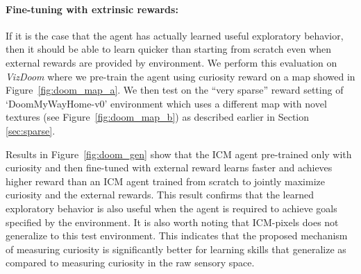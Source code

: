 \documentclass{article}
\begin{document}
\paragraph{Fine-tuning with extrinsic rewards:}
If it is the case that the agent has actually learned useful exploratory behavior, then it should be able to learn quicker than starting from scratch even when external rewards are provided by environment. We perform this evaluation on {\em VizDoom} where we pre-train the agent using curiosity reward on a map showed in Figure~\ref{fig:doom_map_a}. We then test on the ``very sparse'' reward setting of `DoomMyWayHome-v0' environment which uses a different map with novel textures (see Figure~\ref{fig:doom_map_b}) as described earlier in Section \ref{sec:sparse}.

Results in Figure~\ref{fig:doom_gen} show that the ICM agent pre-trained only with curiosity and then fine-tuned with external reward learns faster and achieves higher reward than an ICM agent trained from scratch to jointly maximize curiosity and the external rewards. This result confirms that the learned exploratory behavior is also useful when the agent is required to achieve goals specified by the environment. It is also worth noting that ICM-pixels does not generalize to this test environment. This indicates that the proposed mechanism of measuring curiosity is significantly better for learning skills that generalize as compared to measuring curiosity in the raw sensory space.
\end{document}
